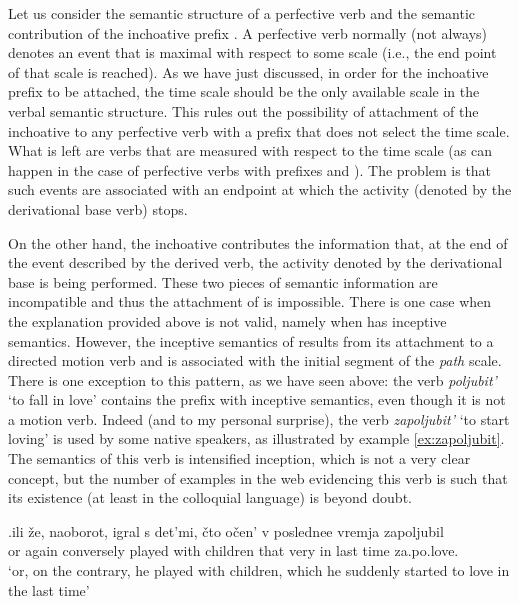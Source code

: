 Let us consider the semantic structure of a perfective verb and the semantic contribution of the inchoative prefix . A perfective verb normally (not always) denotes an event that is maximal with respect to some scale (i.e., the end point of that scale is reached). As we have just discussed, in order for the inchoative prefix  to be attached, the time scale should be the only available scale in the verbal semantic structure. This rules out the possibility of attachment of the inchoative  to any perfective verb with a prefix that does not select the time scale. What is left are verbs that are measured with respect to the time scale (as can happen in the case of perfective verbs with prefixes  and ). The problem is that such events are associated with an endpoint at which the activity (denoted by the derivational base verb) stops. 

On the other hand, the inchoative  contributes the information that, at the end of the event described by the derived verb, the activity denoted by the derivational base is being performed. These two pieces of semantic information are incompatible and thus the attachment of  is impossible. There is one case when the explanation provided above is not valid, namely when  has inceptive semantics. However, the inceptive semantics of  results from its attachment to a directed motion verb and is associated with the initial segment of the \textit{path} scale. There is one exception to this pattern, as we have seen above: the verb \textit{poljubit'} `to fall in love' contains the prefix  with inceptive semantics, even though it is not a motion verb. Indeed (and to my personal surprise), the verb \textit{zapoljubit'} `to start loving' is used by some native speakers, as illustrated by example \ref{ex:zapoljubit}. The semantics of this verb is intensified inception, which is not a very clear concept, but the number of examples in the web evidencing this verb is such that its existence (at least in the colloquial language) is beyond doubt.

\exg.\label{ex:zapoljubit}ili \v{z}e, naoborot, igral s det'mi, \v{c}to o\v{c}en' v poslednee vremja zapoljubil\\
or again conversely played with children that very in last time za.po.love.\\
\trans `or, on the contrary, he played with children, which he suddenly started to love in the last time'

